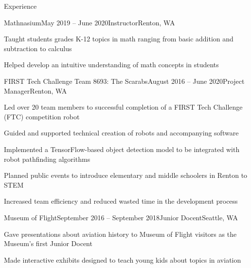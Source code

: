 \documentclass{resume} %
\begin{document}

\begin{rSection}{Experience}

\begin{rSubsection}{Mathnasium}{May 2019 – June 2020}{Instructor}{Renton, WA}
\item Taught students grades K-12 topics in math ranging from basic addition and subtraction to calculus
\item Helped develop an intuitive understanding of math concepts in students
\end{rSubsection}

\begin{rSubsection}{FIRST Tech Challenge Team 8693: The Scarabs}{August 2016 – June 2020}{Project Manager}{Renton, WA}
\item Led over 20 team members to successful completion of a FIRST Tech Challenge (FTC) competition robot
\item Guided and supported technical creation of robots and accompanying software
\item Implemented a TensorFlow-based object detection model to be integrated with robot pathfinding algorithms
\item Planned public events to introduce elementary and middle schoolers in Renton to STEM
\item Increased team efficiency and reduced wasted time in the development process
\end{rSubsection}

\begin{rSubsection}{Museum of Flight}{September 2016 – September 2018}{Junior Docent}{Seattle, WA}
\item Gave presentations about aviation history to Museum of Flight visitors as the Museum's first Junior Docent
\item Made interactive exhibits designed to teach young kids about topics in aviation
\end{rSubsection}

\end{rSection}

\end{document}

